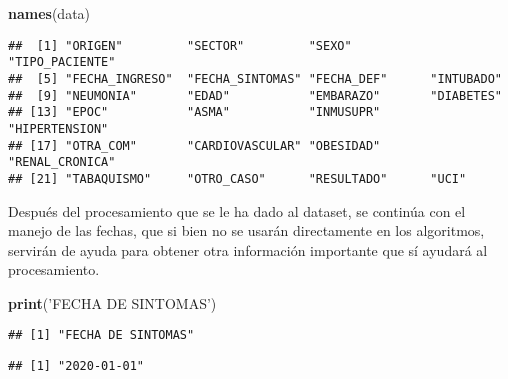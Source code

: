 \documentclass[]{article}
\newenvironment{Shaded}{\begin{snugshade}}{\end{snugshade}}
\newcommand{\KeywordTok}[1]{\textcolor[rgb]{0.13,0.29,0.53}{\textbf{#1}}}
\newcommand{\NormalTok}[1]{#1}
\newcommand{\OperatorTok}[1]{\textcolor[rgb]{0.81,0.36,0.00}{\textbf{#1}}}
\newcommand{\StringTok}[1]{\textcolor[rgb]{0.31,0.60,0.02}{#1}}
\begin{document}
\begin{Shaded}
\begin{Highlighting}[]
\KeywordTok{names}\NormalTok{(data)}
\end{Highlighting}
\end{Shaded}

\begin{verbatim}
##  [1] "ORIGEN"         "SECTOR"         "SEXO"           "TIPO_PACIENTE" 
##  [5] "FECHA_INGRESO"  "FECHA_SINTOMAS" "FECHA_DEF"      "INTUBADO"      
##  [9] "NEUMONIA"       "EDAD"           "EMBARAZO"       "DIABETES"      
## [13] "EPOC"           "ASMA"           "INMUSUPR"       "HIPERTENSION"  
## [17] "OTRA_COM"       "CARDIOVASCULAR" "OBESIDAD"       "RENAL_CRONICA" 
## [21] "TABAQUISMO"     "OTRO_CASO"      "RESULTADO"      "UCI"
\end{verbatim}

Después del procesamiento que se le ha dado al dataset, se continúa con
el manejo de las fechas, que si bien no se usarán directamente en los
algoritmos, servirán de ayuda para obtener otra información importante
que sí ayudará al procesamiento.

\begin{Shaded}
\begin{Highlighting}[]
\KeywordTok{print}\NormalTok{(}\StringTok{'FECHA DE SINTOMAS'}\NormalTok{)}
\end{Highlighting}
\end{Shaded}

\begin{verbatim}
## [1] "FECHA DE SINTOMAS"
\end{verbatim}

\begin{Shaded}
\end{Shaded}

\begin{verbatim}
## [1] "2020-01-01"
\end{verbatim}

\begin{Shaded}
\end{Shaded}
\end{document}
